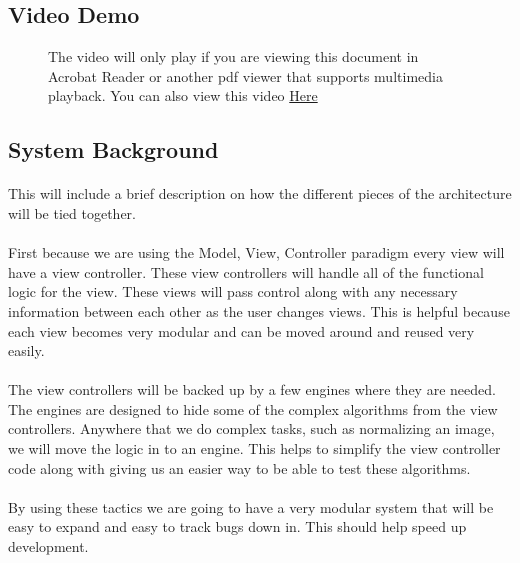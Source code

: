 \newpage
\subsection{Video Demo}

\begin{figure}[H!htb]
\centering
{}
\caption{The video will only play if you are viewing this document in Acrobat Reader or another pdf viewer that supports multimedia playback. You can also view this video \href{http://youtu.be/dN2K_zHrJ9M}{Here}}
\end{figure}

\subsection{System Background}
\paragraph{} This will include a brief description on how the different pieces of the architecture will be tied together.
\paragraph{} First because we are using the Model, View, Controller paradigm every view will have a view controller. These view controllers will handle all of the functional logic for the view. These views will pass control along with any necessary information between each other as the user changes views. This is helpful because each view becomes very modular and can be moved around and reused very easily.
\paragraph{} The view controllers will be backed up by a few engines where they are needed. The engines are designed to hide some of the complex algorithms from the view controllers. Anywhere that we do complex tasks, such as normalizing an image, we will move the logic in to an engine. This helps to simplify the view controller code along with giving us an easier way to be able to test these algorithms.
\paragraph{} By using these tactics we are going to have a very modular system that will be easy to expand and easy to track bugs down in. This should help speed up development.  
